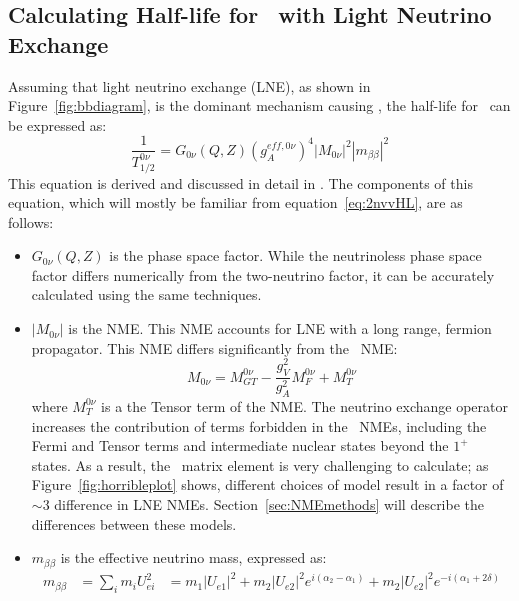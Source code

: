 \documentclass[/main.tex]{subfiles}
\begin{document}
\subsection{Calculating Half-life for \znbb\ with Light Neutrino Exchange}
Assuming that light neutrino exchange (LNE), as shown in Figure~\ref{fig:bbdiagram}, is the dominant mechanism causing \znbb, the half-life for \znbb\ can be expressed as:
\begin{equation}
  \frac{1}{T^{0\nu}_{1/2}}=G_{0\nu}(Q,Z)(g_A^{eff,0\nu})^4|M_{0\nu}|^2|m_{\beta\beta}|^2
\end{equation}
This equation is derived and discussed in detail in \cite{Avignone2008, Engel2017}.
The components of this equation, which will mostly be familiar from equation~\ref{eq:2nvvHL}, are as follows:
\begin{itemize}
\item $G_{0\nu}(Q,Z)$ is the phase space factor.
  While the neutrinoless phase space factor differs numerically from the two-neutrino factor, it can be accurately calculated using the same techniques.
\item $|M_{0\nu}|$ is the NME.
  This NME accounts for LNE with a long range, fermion propagator.
  This NME differs significantly from the \tnbb\ NME:
  \begin{equation}
    M_{0\nu}=M^{0\nu}_{GT} - \frac{g_V^2}{g_A^2}M^{0\nu}_F+M^{0\nu}_T
  \end{equation}
  where $M^{0\nu}_T$ is a the Tensor term of the NME.
  The neutrino exchange operator increases the contribution of terms forbidden in the \tnbb\ NMEs, including the Fermi and Tensor terms and intermediate nuclear states beyond the $1^+$ states.
  As a result, the \znbb\ matrix element is very challenging to calculate; as Figure~\ref{fig:horribleplot} shows, different choices of model result in a factor of ${\sim}3$ difference in LNE NMEs.
  Section~\ref{sec:NMEmethods} will describe the differences between these models.
\item $m_{\beta\beta}$ is the effective neutrino mass, expressed as:
  \begin{equation} \label{eq:mbb}
    \begin{aligned}
      m_{\beta\beta}&=\sum_i m_iU_{ei}^2
      &=m_1|U_{e1}|^2+m_2|U_{e2}|^2e^{i(\alpha_2-\alpha_1)}+m_2|U_{e2}|^2e^{-i(\alpha_1+2\delta)}
    \end{aligned}
  \end{equation}
  \begin{figure}[p]
    \centering

\end{figure}
\end{itemize}
\end{document}

